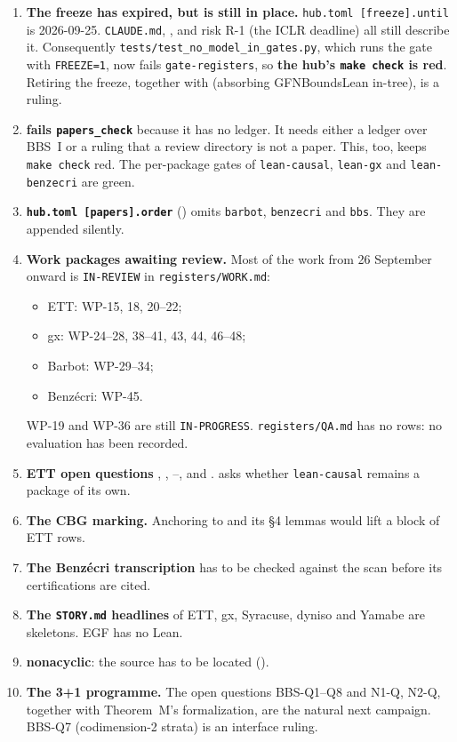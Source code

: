 \begin{enumerate}
\item \textbf{The freeze has expired, but is still in place.} \texttt{hub.toml [freeze].until}
  is 2026-09-25. \texttt{CLAUDE.md}, , and risk R-1 (the ICLR deadline) all still describe
  it. Consequently \texttt{tests/test\_no\_model\_in\_gates.py}, which runs the gate with
  \texttt{FREEZE=1}, now fails \texttt{gate-registers}, so \textbf{the hub's \texttt{make check}
  is red}. Retiring the freeze, together with  (absorbing GFNBoundsLean in-tree), is a
  ruling.
\item \textbf{ fails \texttt{papers\_check}} because it has no ledger. It needs
  either a ledger over BBS~I or a ruling that a review directory is not a paper. This, too, keeps
  \texttt{make check} red. The per-package gates of \texttt{lean-causal}, \texttt{lean-gx} and
  \texttt{lean-benzecri} are green.
\item \textbf{\texttt{hub.toml [papers].order}} () omits \texttt{barbot},
  \texttt{benzecri} and \texttt{bbs}. They are appended silently.
\item \textbf{Work packages awaiting review.} Most of the work from 26 September onward is
  \texttt{IN-REVIEW} in \texttt{registers/WORK.md}:
  \begin{itemize}
  \item ETT: WP-15, 18, 20--22;
  \item gx: WP-24--28, 38--41, 43, 44, 46--48;
  \item Barbot: WP-29--34;
  \item Benzécri: WP-45.
  \end{itemize}
  WP-19 and WP-36 are still \texttt{IN-PROGRESS}. \texttt{registers/QA.md} has no rows: no
  evaluation has been recorded.
\item \textbf{ETT open questions} , , --,  and .
   asks whether \texttt{lean-causal} remains a package of its own.
\item \textbf{The CBG marking.} Anchoring  to  and its §4 lemmas
  would lift a block of ETT rows.
\item \textbf{The Benzécri transcription} has to be checked against the scan before its
  certifications are cited.
\item \textbf{The \texttt{STORY.md} headlines} of ETT, gx, Syracuse, dyniso and Yamabe are
  skeletons. EGF has no Lean.
\item \textbf{nonacyclic}: the source has to be located ().
\item \textbf{The 3+1 programme.} The open questions BBS-Q1--Q8 and N1-Q, N2-Q, together with
  Theorem~M's formalization, are the natural next campaign. BBS-Q7 (codimension-2 strata) is an
  interface ruling.
\end{enumerate}

